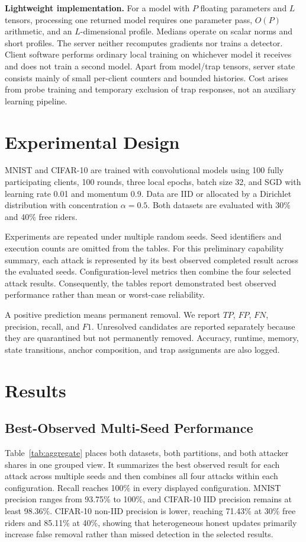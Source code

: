 \documentclass[conference]{IEEEtran}
\begin{document}
\medskip\noindent\textbf{Lightweight implementation.}
For a model with $P$ floating parameters and $L$ tensors, processing one returned model requires one parameter pass, $O(P)$ arithmetic, and an $L$-dimensional profile. Medians operate on scalar norms and short profiles. The server neither recomputes gradients nor trains a detector. Client software performs ordinary local training on whichever model it receives and does not train a second model. Apart from model/trap tensors, server state consists mainly of small per-client counters and bounded histories. Cost arises from probe training and temporary exclusion of trap responses, not an auxiliary learning pipeline.

\section{Experimental Design}
MNIST \cite{lecun1998gradient} and CIFAR-10 \cite{krizhevsky2009learning} are trained with convolutional models using 100 fully participating clients, 100 rounds, three local epochs, batch size 32, and SGD with learning rate 0.01 and momentum 0.9. Data are IID or allocated by a Dirichlet distribution with concentration $\alpha=0.5$. Both datasets are evaluated with 30\% and 40\% free riders.

Experiments are repeated under multiple random seeds. Seed identifiers and execution counts are omitted from the tables. For this preliminary capability summary, each attack is represented by its best observed completed result across the evaluated seeds. Configuration-level metrics then combine the four selected attack results. Consequently, the tables report demonstrated best observed performance rather than mean or worst-case reliability.

A positive prediction means permanent removal. We report $TP$, $FP$, $FN$, precision, recall, and $F1$. Unresolved candidates are reported separately because they are quarantined but not permanently removed. Accuracy, runtime, memory, state transitions, anchor composition, and trap assignments are also logged.

\section{Results}
\subsection{Best-Observed Multi-Seed Performance}
Table~\ref{tab:aggregate} places both datasets, both partitions, and both attacker shares in one grouped view. It summarizes the best observed result for each attack across multiple seeds and then combines all four attacks within each configuration. Recall reaches 100\% in every displayed configuration. MNIST precision ranges from 93.75\% to 100\%, and CIFAR-10 IID precision remains at least 98.36\%. CIFAR-10 non-IID precision is lower, reaching 71.43\% at 30\% free riders and 85.11\% at 40\%, showing that heterogeneous honest updates primarily increase false removal rather than missed detection in the selected results.
\end{document}
